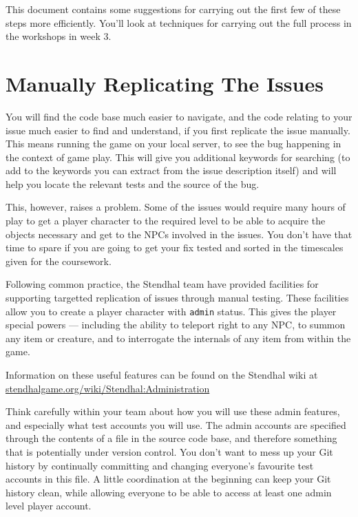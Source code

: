 \documentclass[
]{book}
\begin{document}
This document contains some suggestions for carrying out the first few of these steps more efficiently. You'll look at techniques for carrying out the full process in the workshops in week 3.

\hypertarget{replicating}{%
\section{Manually Replicating The Issues}\label{replicating}}

You will find the code base much easier to navigate, and the code relating to your issue much easier to find and understand, if you first replicate the issue manually. This means running the game on your local server, to see the bug happening in the context of game play. This will give you additional keywords for searching (to add to the keywords you can extract from the issue description itself) and will help you locate the relevant tests and the source of the bug.

This, however, raises a problem. Some of the issues would require many hours of play to get a player character to the required level to be able to acquire the objects necessary and get to the NPCs involved in the issues. You don't have that time to spare if you are going to get your fix tested and sorted in the timescales given for the coursework.

Following common practice, the Stendhal team have provided facilities for supporting targetted replication of issues through manual testing. These facilities allow you to create a player character with \texttt{admin} status. This gives the player special powers --- including the ability to teleport right to any NPC, to summon any item or creature, and to interrogate the internals of any item from within the game.

Information on these useful features can be found on the Stendhal wiki at \href{https://stendhalgame.org/wiki/Stendhal:Administration}{stendhalgame.org/wiki/Stendhal:Administration}

Think carefully within your team about how you will use these admin features, and especially what test accounts you will use. The admin accounts are specified through the contents of a file in the source code base, and therefore something that is potentially under version control. You don't want to mess up your Git history by continually committing and changing everyone's favourite test accounts in this file. A little coordination at the beginning can keep your Git history clean, while allowing everyone to be able to access at least one admin level player account.
\end{document}
